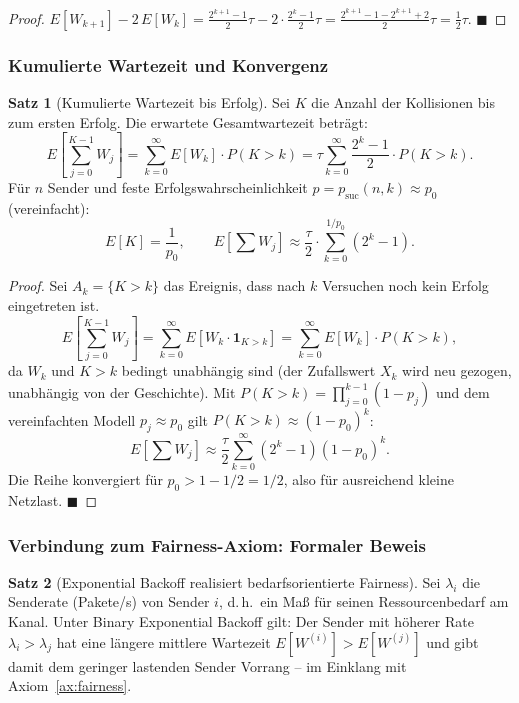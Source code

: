 ﻿\documentclass[a4paper,12pt]{article}
\theoremstyle{definition}
\newtheorem{satz}{Satz}
\begin{document}
\begin{proof}
$E[W_{k+1}] - 2\,E[W_k]
= \frac{2^{k+1}-1}{2}\tau - 2\cdot\frac{2^k-1}{2}\tau
= \frac{2^{k+1}-1-2^{k+1}+2}{2}\tau
= \frac{1}{2}\tau$.
\hfill$\blacksquare$
\end{proof}

\subsubsection{Kumulierte Wartezeit und Konvergenz}

\begin{satz}[Kumulierte Wartezeit bis Erfolg]
\label{satz:kumuliert}
Sei $K$ die Anzahl der Kollisionen bis zum ersten Erfolg.
Die erwartete Gesamtwartezeit beträgt:
\[
  E\!\left[\sum_{j=0}^{K-1} W_j\right]
  = \sum_{k=0}^{\infty} E[W_k] \cdot P(K > k)
  = \tau \sum_{k=0}^{\infty} \frac{2^k - 1}{2} \cdot P(K > k).
\]
Für $n$ Sender und feste Erfolgswahrscheinlichkeit
$p = p_{\mathrm{suc}}(n, k) \approx p_0$ (vereinfacht):
\[
  E[K] = \frac{1}{p_0}, \qquad
  E\!\left[\sum W_j\right] \approx \frac{\tau}{2} \cdot
  \sum_{k=0}^{1/p_0} (2^k - 1).
\]
\end{satz}

\begin{proof}
Sei $A_k = \{K > k\}$ das Ereignis, dass nach $k$ Versuchen noch kein
Erfolg eingetreten ist.
\[
  E\!\left[\sum_{j=0}^{K-1} W_j\right]
  = \sum_{k=0}^{\infty} E[W_k \cdot \mathbf{1}_{K>k}]
  = \sum_{k=0}^{\infty} E[W_k] \cdot P(K > k),
\]
da $W_k$ und $K > k$ bedingt unabhängig sind (der Zufallswert
$X_k$ wird neu gezogen, unabhängig von der Geschichte).
Mit $P(K > k) = \prod_{j=0}^{k-1}(1-p_j)$ und dem vereinfachten
Modell $p_j \approx p_0$ gilt $P(K > k) \approx (1-p_0)^k$:
\[
  E\!\left[\sum W_j\right]
  \approx \frac{\tau}{2} \sum_{k=0}^{\infty} (2^k - 1)(1-p_0)^k.
\]
Die Reihe konvergiert für $p_0 > 1 - 1/2 = 1/2$, also für
ausreichend kleine Netzlast.
\hfill$\blacksquare$
\end{proof}

\subsubsection{Verbindung zum Fairness-Axiom: Formaler Beweis}

\begin{satz}[Exponential Backoff realisiert bedarfsorientierte Fairness]
\label{satz:backoff_fairness}
Sei $\lambda_i$ die Senderate (Pakete/s) von Sender $i$, d.\,h.\ ein
Maß für seinen Ressourcenbedarf am Kanal.
Unter Binary Exponential Backoff gilt: Der Sender mit höherer Rate
$\lambda_i > \lambda_j$ hat eine längere mittlere Wartezeit
$E[W^{(i)}] > E[W^{(j)}]$ und gibt damit dem geringer lastenden
Sender Vorrang -- im Einklang mit Axiom~\ref{ax:fairness}.
\end{satz}
\end{document}
